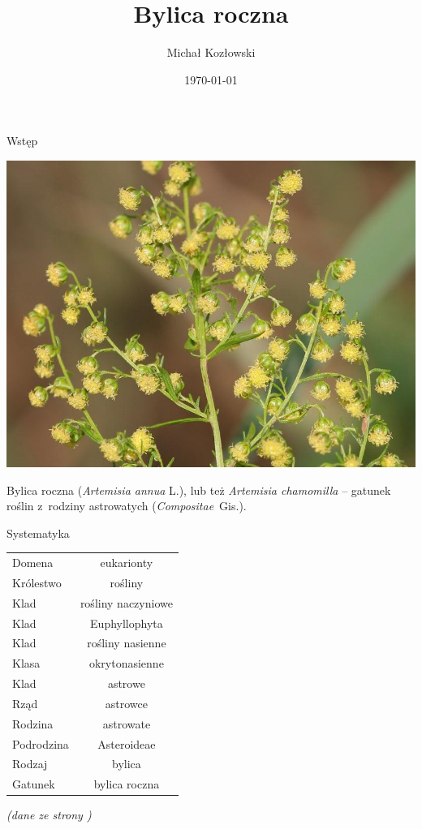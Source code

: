 \documentclass{beamer}
\title{Bylica roczna}
\author{Michał Kozłowski}
\date{\today}
\institute{UWM}
\begin{document}
\frame{\titlepage}
	
\begin{frame}{Wstęp}
	\begin{center}
	\includegraphics[scale = 0.6]{grafika/ilustracja.jpeg}
	\end{center}
	Bylica roczna (\textit{Artemisia annua} L.), lub też \textit{Artemisia chamomilla}\cite{site2} – gatunek roślin z~rodziny astrowatych (\textit{Compositae}~Gis.).
\end{frame}

\begin{frame}{Systematyka}
	\centering
	\begin{table}
		\begin{tabular}{lc}
		Domena&eukarionty\\ \pause
		Królestwo&rośliny\\ \pause
		Klad&rośliny naczyniowe\\ \pause
		Klad&Euphyllophyta\\ \pause
		Klad&rośliny nasienne\\ \pause
		Klasa&okrytonasienne\\ \pause
		Klad&astrowe\\ \pause
		Rząd&astrowce\\ \pause
		Rodzina&astrowate\\ \pause
		Podrodzina&Asteroideae\\ \pause
		Rodzaj&bylica\\ \pause
		Gatunek&bylica roczna\\
		\end{tabular}
	\end{table}
	\textit{ (dane ze strony \cite{site1}) }
\end{frame}
\end{document}
